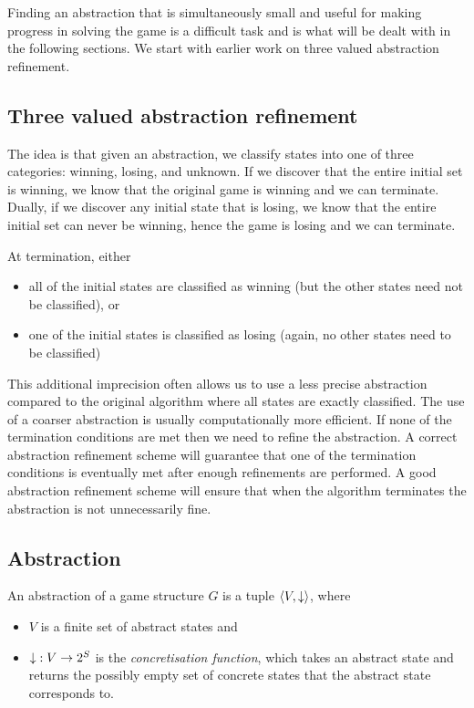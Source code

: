 Finding an abstraction that is simultaneously small and useful for making progress in solving the game is a difficult task and is what will be dealt with in the following sections. We start with earlier work on three valued abstraction refinement. 

\subsection{Three valued abstraction refinement}

The idea is that given an abstraction, we classify states into one of three categories: winning, losing, and unknown. If we discover that the entire initial set is winning, we know that the original game is winning and we can terminate. Dually, if we discover any initial state that is losing, we know that the entire initial set can never be winning, hence the game is losing and we can terminate. 

At termination, either 
\begin{itemize}
\item all of the initial states are classified as winning (but the other states need not be classified), or
\item one of the initial states is classified as losing (again, no other states need to be classified)
\end{itemize}

This additional imprecision often allows us to use a less precise abstraction compared to the original algorithm where all states are exactly classified. The use of a coarser abstraction is usually computationally more efficient. If none of the termination conditions are met then we need to refine the abstraction. A correct abstraction refinement scheme will guarantee that one of the termination conditions is eventually met after enough refinements are performed. A good abstraction refinement scheme will ensure that when the algorithm terminates the abstraction is not unnecessarily fine.

\subsection{Abstraction}

An abstraction of a game structure $G$ is a tuple $\langle V, \mathord{\downarrow}\rangle$, where 
\begin{itemize}
    \item $V$ is a finite set of abstract states and 
    \item $\mathord{\downarrow} : V \rightarrow 2^S $ is the \emph{concretisation function}, which takes an abstract state and returns the possibly empty set of concrete states that the abstract state corresponds to.  
\end{itemize}
        
